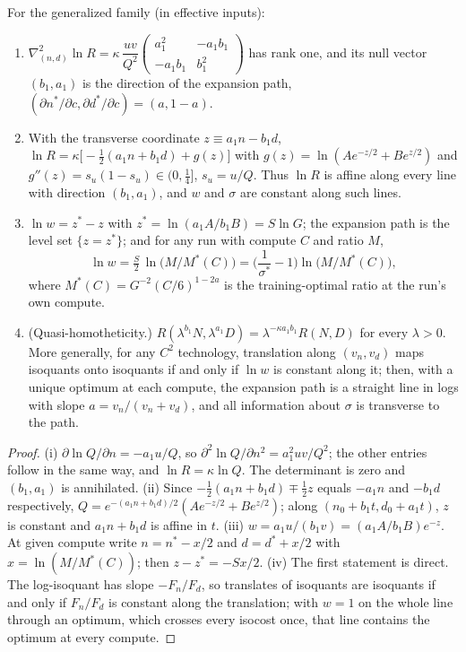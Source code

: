 \begin{lemma}\label{lem:geometry}
For the generalized family (in effective inputs):
\begin{enumerate}
\item[(i)] $\nabla^2_{(n,d)}\ln R=\kappa\,\dfrac{uv}{Q^2}\begin{pmatrix}a_1^2&-a_1b_1\\-a_1b_1&b_1^2\end{pmatrix}$ has rank
one, and its null vector $(b_1,a_1)$ is the direction of the expansion path,
$(\partial n^*/\partial c,\partial d^*/\partial c)=(a,1-a)$.
\item[(ii)] With the transverse coordinate $z\equiv a_1n-b_1d$,
$\ln R=\kappa\big[-\tfrac12(a_1n+b_1d)+g(z)\big]$ with $g(z)=\ln(Ae^{-z/2}+Be^{z/2})$ and $g''(z)=s_u(1-s_u)\in(0,\tfrac14]$,
$s_u=u/Q$. Thus $\ln R$ is affine along every line with direction $(b_1,a_1)$, and $w$ and $\sigma$ are constant along
such lines.
\item[(iii)] $\ln w=z^*-z$ with $z^*=\ln(a_1A/b_1B)=S\ln G$; the expansion path is the level set $\{z=z^*\}$; and for any
run with compute $C$ and ratio $M$,
\begin{equation}\label{eq:A-wM}
\ln w=\tfrac{S}{2}\,\ln\!\big(M/M^*(C)\big)=\Big(\frac1{\sigma^*}-1\Big)\ln\!\big(M/M^*(C)\big),
\end{equation}
where $M^*(C)=G^{-2}(C/6)^{1-2a}$ is the training-optimal ratio at the run's own compute.
\item[(iv)] (Quasi-homotheticity.) $R(\lambda^{b_1}N,\lambda^{a_1}D)=\lambda^{-\kappa a_1b_1}R(N,D)$ for every $\lambda>0$.
More generally, for any $C^2$ technology, translation along $(v_n,v_d)$ maps isoquants onto isoquants if and only if
$\ln w$ is constant along it; then, with a unique optimum at each compute, the expansion path is a straight line in logs
with slope $a=v_n/(v_n+v_d)$, and all information about $\sigma$ is transverse to the path.
\end{enumerate}
\end{lemma}

\begin{proof}
(i) $\partial\ln Q/\partial n=-a_1u/Q$, so $\partial^2\ln Q/\partial n^2=a_1^2uv/Q^2$; the other entries follow in the same
way, and $\ln R=\kappa\ln Q$. The determinant is zero and $(b_1,a_1)$ is annihilated. (ii) Since
$-\frac12(a_1n+b_1d)\mp\frac12z$ equals $-a_1n$ and $-b_1d$ respectively, $Q=e^{-(a_1n+b_1d)/2}(Ae^{-z/2}+Be^{z/2})$; along
$(n_0+b_1t,d_0+a_1t)$, $z$ is constant and $a_1n+b_1d$ is affine in $t$. (iii) $w=a_1u/(b_1v)=(a_1A/b_1B)e^{-z}$. At given
compute write $n=n^*-x/2$ and $d=d^*+x/2$ with $x=\ln(M/M^*(C))$; then $z-z^*=-Sx/2$. (iv) The first statement is direct.
The log-isoquant has slope $-F_n/F_d$, so translates of isoquants are isoquants if and only if $F_n/F_d$ is constant
along the translation; with $w=1$ on the whole line through an optimum, which crosses every isocost once, that line
contains the optimum at every compute.
\end{proof}

